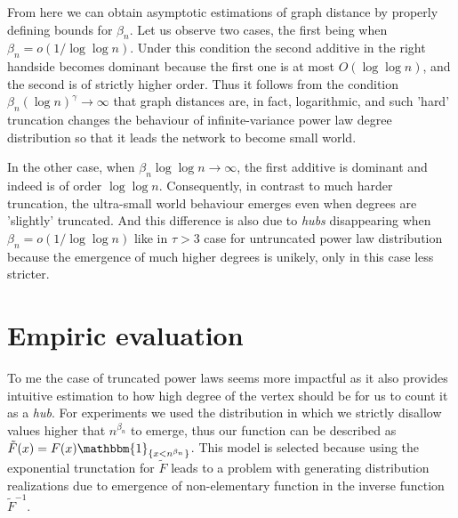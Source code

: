 \documentclass[a4paper]{article}
\begin{document}
From here we can obtain asymptotic estimations of graph distance by properly defining bounds for $\beta_n$. Let us observe two cases, the first being when $\beta_n = o(1 / \log\log n)$. Under this condition the second additive in the right handside becomes dominant because the first one is at most $O(\log\log n)$, and the second is of strictly higher order. Thus it follows from the condition $\beta_n (\log n)^\gamma \rightarrow \infty$ that graph distances are, in fact, logarithmic, and such 'hard' truncation changes the behaviour of infinite-variance power law  degree distribution so that it leads the network to become small world.

In the other case, when $\beta_n \log\log n \rightarrow \infty$, the first additive is dominant and indeed is of order $\log\log n$. Consequently, in contrast to much harder truncation, the ultra-small world behaviour emerges even when degrees are 'slightly' truncated. And this difference is also due to \emph{hubs} disappearing when $\beta_n = o(1 / \log\log n)$ like in $\tau > 3$ case for untruncated power law distribution because the emergence of much higher degrees is unikely, only in this case less stricter.

\section{Empiric evaluation}

To me the case of truncated power laws seems more impactful as it also provides intuitive estimation to how high degree of the vertex should be for us to count it as a \emph{hub}. For experiments we used the distribution in which we strictly disallow values higher that $n^{\beta_n}$ to emerge, thus our function can be described as $\tilde{F}(x) = F(x) \mathbbm{1}_{\{x < n^{\beta_n}\}}$. This model is selected because using the exponential trunctation for $\tilde{F}$ leads to a problem with generating distribution realizations due to emergence of non-elementary function in the inverse function $\tilde{F}^{-1}$.
\end{document}
